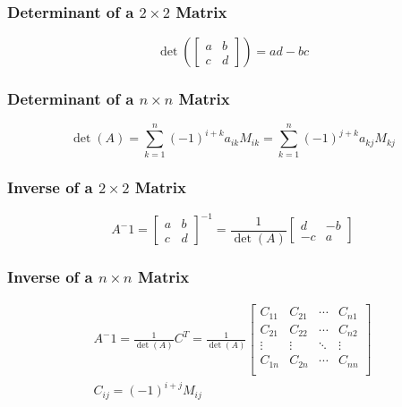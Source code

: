 \documentclass{article}
\begin{document}
        \subsubsection {Determinant of a $2 \times 2$ Matrix}
        \begin{equation}
            \det(\begin{bmatrix} a & b \\ c & d \end{bmatrix}) = ad - bc
        \end{equation}

        \subsubsection {Determinant of a $n \times n$ Matrix}
        \begin{equation}
            \det(A) = \sum^n_{k=1} (-1)^{i+k} a_{ik} M_{ik} = \sum^n_{k=1} (-1)^{j+k} a_{kj} M_{kj}
        \end{equation}

        \subsubsection {Inverse of a $2 \times 2$ Matrix}
        \begin{equation}
            A^-1 = \begin{bmatrix} a & b \\ c & d \end{bmatrix}^{-1} = \frac 1 {\det(A)} \begin{bmatrix} d & -b \\ -c & a\end{bmatrix}
        \end{equation}

        \subsubsection {Inverse of a $n \times n$ Matrix}
        \begin{equation}
            \begin{split}
            A^-1 = \frac 1 {\det(A)} C^T = \frac 1 {\det(A)} \begin{bmatrix} 
                C_{11} & C_{21} & \cdots & C_{n1} \\ 
                C_{21} & C_{22} & \cdots & C_{n2} \\
                \vdots & \vdots & \ddots & \vdots \\
                C_{1n} & C_{2n} & \cdots & C_{nn} \\
            \end{bmatrix} \\
            C_{ij} = (-1)^{i+j}M_{ij}
        \end{split}
        \end{equation}
\end{document}
